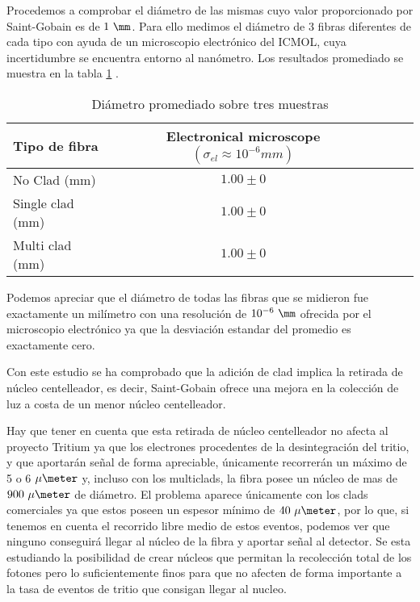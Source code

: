 Procedemos a comprobar el diámetro de las mismas cuyo valor proporcionado por Saint-Gobain es de $1~\mm$. Para ello medimos el diámetro de 3 fibras diferentes de cada tipo con ayuda de un microscopio electrónico del ICMOL, cuya incertidumbre se encuentra entorno al nanómetro. Los resultados promediado se muestra en la tabla \ref{diametros} .

\begin{table}[H]
\begin{center}
\begin{tabular}{l | c | c | c | c }
Tipo de fibra & Electronical microscope $(\sigma_{el}\approx 10^{-6} mm)$\\
\hline \hline
No Clad (mm)& $1.00 \pm 0$\\ 
Single clad (mm) & $1.00 \pm 0$\\
Multi clad (mm)  & $1.00 \pm 0$\\
\end{tabular}
\caption{Diámetro promediado sobre tres muestras\label{diametros}}
\end{center}
\end{table}

Podemos apreciar que el diámetro de todas las fibras que se midieron fue exactamente un milímetro con una resolución de $10^{-6}~\mm$ ofrecida por el microscopio electrónico ya que la desviación estandar del promedio es exactamente cero. 

Con este estudio se ha comprobado que la adición de clad implica la retirada de núcleo centelleador, es decir, Saint-Gobain ofrece una mejora en la colección de luz a costa de un menor núcleo centelleador. 

Hay que tener en cuenta que esta retirada de núcleo centelleador no afecta al proyecto Tritium ya que los electrones procedentes de la desintegración del tritio, y que aportarán señal de forma apreciable, únicamente recorrerán un máximo de 5 o 6$~\mu\meter$ y, incluso con los multiclads, la fibra posee un núcleo de mas de $900~\mu\meter$ de diámetro. El problema aparece únicamente con los clads comerciales ya que estos poseen un espesor mínimo de $40~\mu\meter$, por lo que, si tenemos en cuenta el recorrido libre medio de estos eventos, podemos ver que ninguno conseguirá llegar al núcleo de la fibra y aportar señal al detector. Se esta estudiando la posibilidad de crear núcleos que permitan la recolección total de los fotones pero lo suficientemente finos para que no afecten de forma importante a la tasa de eventos de tritio que consigan llegar al nucleo.